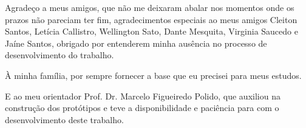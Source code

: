 \begin{agradecimentos}

Agradeço a meus amigos, que não me deixaram abalar nos momentos onde os prazos não pareciam ter fim, agradecimentos especiais ao meus amigos Cleiton Santos, Letícia Callistro, Wellington Sato, Dante Mesquita, Virginia Saucedo e Jaíne Santos, obrigado por entenderem minha ausência no processo de desenvolvimento do trabalho.

À minha família, por sempre fornecer a base que eu precisei para meus estudos.

E ao meu orientador Prof. Dr. Marcelo Figueiredo Polido, que auxiliou na construção dos protótipos e teve a disponibilidade e paciência para com o desenvolvimento deste trabalho.

\end{agradecimentos}

